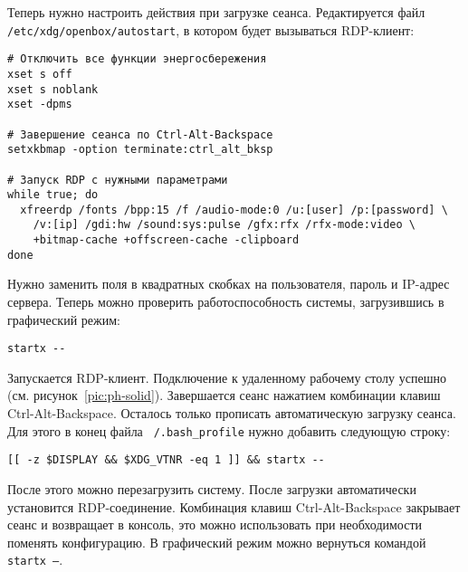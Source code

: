 Теперь нужно настроить действия при загрузке сеанса. Редактируется файл
\texttt{/etc/xdg/openbox/autostart}, в котором будет вызываться RDP-клиент:
\begin{verbatim}
# Отключить все функции энергосбережения
xset s off
xset s noblank
xset -dpms

# Завершение сеанса по Ctrl-Alt-Backspace
setxkbmap -option terminate:ctrl_alt_bksp

# Запуск RDP с нужными параметрами
while true; do
  xfreerdp /fonts /bpp:15 /f /audio-mode:0 /u:[user] /p:[password] \
    /v:[ip] /gdi:hw /sound:sys:pulse /gfx:rfx /rfx-mode:video \
    +bitmap-cache +offscreen-cache -clipboard
done
\end{verbatim}

Нужно заменить поля в квадратных скобках на пользователя, пароль и IP-адрес сервера.
Теперь можно проверить работоспособность системы, загрузившись в графический режим:
\begin{verbatim}
startx --
\end{verbatim}

Запускается RDP-клиент. Подключение к удаленному рабочему столу успешно (см.
рисунок~\ref{pic:ph-solid}). Завершается
сеанс нажатием комбинации клавиш Ctrl-Alt-Backspace. Осталось только прописать
автоматическую загрузку сеанса. Для этого в конец файла \texttt{~/.bash\_profile} нужно
добавить следующую строку:
\begin{verbatim}
[[ -z $DISPLAY && $XDG_VTNR -eq 1 ]] && startx --
\end{verbatim}

После этого можно перезагрузить систему. После загрузки автоматически установится
RDP-соединение. Комбинация клавиш Ctrl-Alt-Backspace закрывает сеанс и возвращает в
консоль, это можно использовать при необходимости поменять конфигурацию. В графический
режим можно вернуться командой \texttt{startx --}.


